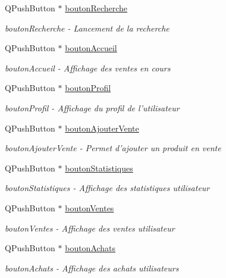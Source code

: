 \begin{DoxyCompactItemize}
Q\-Push\-Button $\ast$ \hyperlink{class_ma_fenetre_afe6e47d40e487fccd18d4bcc3c57e64e}{bouton\-Recherche}
\begin{DoxyCompactList}\small\item\em bouton\-Recherche -\/ Lancement de la recherche \end{DoxyCompactList}\item 
Q\-Push\-Button $\ast$ \hyperlink{class_ma_fenetre_a0316aa06b89b812a8528a8ccbe81561a}{bouton\-Accueil}
\begin{DoxyCompactList}\small\item\em bouton\-Accueil -\/ Affichage des ventes en cours \end{DoxyCompactList}\item 
Q\-Push\-Button $\ast$ \hyperlink{class_ma_fenetre_a406ca1016af97e007bc633efabed744b}{bouton\-Profil}
\begin{DoxyCompactList}\small\item\em bouton\-Profil -\/ Affichage du profil de l'utilisateur \end{DoxyCompactList}\item 
Q\-Push\-Button $\ast$ \hyperlink{class_ma_fenetre_a422d1e619aa51ff42b5ecd2c5476ce19}{bouton\-Ajouter\-Vente}
\begin{DoxyCompactList}\small\item\em bouton\-Ajouter\-Vente -\/ Permet d'ajouter un produit en vente \end{DoxyCompactList}\item 
Q\-Push\-Button $\ast$ \hyperlink{class_ma_fenetre_ac438e7ad115265305422aadd11a04b50}{bouton\-Statistiques}
\begin{DoxyCompactList}\small\item\em bouton\-Statistiques -\/ Affichage des statistiques utilisateur \end{DoxyCompactList}\item 
Q\-Push\-Button $\ast$ \hyperlink{class_ma_fenetre_a9399bb35a8e0a832597a2f3cb4e8dea3}{bouton\-Ventes}
\begin{DoxyCompactList}\small\item\em bouton\-Ventes -\/ Affichage des ventes utilisateur \end{DoxyCompactList}\item 
Q\-Push\-Button $\ast$ \hyperlink{class_ma_fenetre_aba39f3cf91351a7d6d0a6188ac831ad5}{bouton\-Achats}
\begin{DoxyCompactList}\small\item\em bouton\-Achats -\/ Affichage des achats utilisateurs \end{DoxyCompactList}\item 

\end{DoxyCompactItemize}
